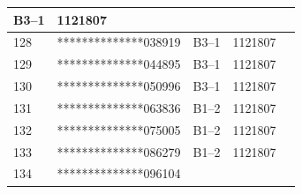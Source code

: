 \documentclass[UTF8,10pt,a4paper,fontset=fandol]{ctexart}
\newcommand{\fieldvalue}[1]{#1}
\begin{document}
\begin{center}
\begin{tabular}{|p{1.0cm}|p{3.8cm}|p{2.3cm}|p{2.8cm}|p{2.2cm}|}
\fieldvalue{B3--1} &
\fieldvalue{1121807} & \\ \hline
\fieldvalue{128} &
\fieldvalue{**************038919} &
\fieldvalue{B3--1} &
\fieldvalue{1121807} & \\ \hline
\fieldvalue{129} &
\fieldvalue{**************044895} &
\fieldvalue{B3--1} &
\fieldvalue{1121807} & \\ \hline
\fieldvalue{130} &
\fieldvalue{**************050996} &
\fieldvalue{B3--1} &
\fieldvalue{1121807} & \\ \hline
\fieldvalue{131} &
\fieldvalue{**************063836} &
\fieldvalue{B1--2} &
\fieldvalue{1121807} & \\ \hline
\fieldvalue{132} &
\fieldvalue{**************075005} &
\fieldvalue{B1--2} &
\fieldvalue{1121807} & \\ \hline
\fieldvalue{133} &
\fieldvalue{**************086279} &
\fieldvalue{B1--2} &
\fieldvalue{1121807} & \\ \hline
\fieldvalue{134} &
\fieldvalue{**************096104} &

\end{tabular}
\end{center}
\end{document}
